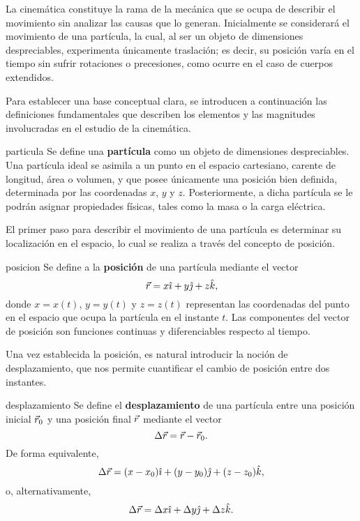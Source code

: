 La cinemática constituye la rama de la mecánica que se ocupa de describir el movimiento sin analizar las causas que lo generan. Inicialmente se considerará el movimiento de una partícula, la cual, al ser un objeto de dimensiones despreciables, experimenta únicamente traslación; es decir, su posición varía en el tiempo sin sufrir rotaciones o precesiones, como ocurre en el caso de cuerpos extendidos.

Para establecer una base conceptual clara, se introducen a continuación las definiciones fundamentales que describen los elementos y las magnitudes involucradas en el estudio de la cinemática.

\begin{definition}{}{particula}
    Se define una \textbf{partícula} como un objeto de dimensiones despreciables. Una partícula ideal se asimila a un punto en el espacio cartesiano, carente de longitud, área o volumen, y que posee únicamente una posición bien definida, determinada por las coordenadas $x$, $y$ y $z$. Posteriormente, a dicha partícula se le podrán asignar propiedades físicas, tales como la masa o la carga eléctrica.
\end{definition}

El primer paso para describir el movimiento de una partícula es determinar su localización en el espacio, lo cual se realiza a través del concepto de posición.

\begin{definition}{}{posicion}
    Se define a la \textbf{posición} de una partícula mediante el vector
    $$\vec{r} = x\hat{\imath} + y\hat{\jmath} + z\hat{k},$$
    donde $x = x(t)$, $y = y(t)$ y $z = z(t)$ representan las coordenadas del punto en el espacio que ocupa la partícula en el instante $t$. Las componentes del vector de posición son funciones continuas y diferenciables respecto al tiempo.
\end{definition}

Una vez establecida la posición, es natural introducir la noción de desplazamiento, que nos permite cuantificar el cambio de posición entre dos instantes.

\begin{definition}{}{desplazamiento}
    Se define el \textbf{desplazamiento} de una partícula entre una posición inicial $\vec{r}_0$ y una posición final $\vec{r}$ mediante el vector
    $$\Delta\vec{r} = \vec{r} - \vec{r}_0.$$
    De forma equivalente,
    $$\Delta\vec{r} = (x - x_0)\hat{\imath} + (y - y_0)\hat{\jmath} + (z - z_0)\hat{k},$$
    o, alternativamente,
    $$\Delta\vec{r} = \Delta x\hat{\imath} + \Delta y\hat{\jmath} + \Delta z\hat{k}.$$
\end{definition}

